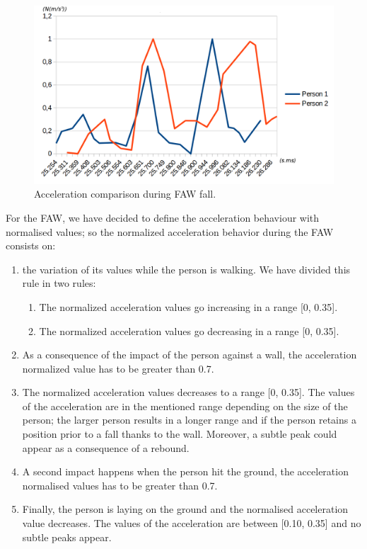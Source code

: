 \documentclass[review]{elsarticle}
\begin{document}
\begin{figure}[!ht]
	\centering
	\includegraphics[scale=0.25]{Images/TwoFallsComparative.png}
	\caption[Acceleration during FAW fall]{Acceleration comparison during FAW fall.}
	\label{fig:FAWcomparison}
\end{figure}

For the FAW, we have decided to define the acceleration behaviour with normalised values; so the 
normalized acceleration behavior during the FAW consists on:
\begin{enumerate}
	\item the variation of its values while the person is walking. We have divided this rule in two rules:
	\begin{enumerate}
		\item The normalized acceleration values go increasing in a range [0, 0.35].
		\item The normalized acceleration values go decreasing in a range [0, 0.35].
	\end{enumerate}
	\item As a consequence of the impact of the person against a wall, the acceleration normalized value 
	has to be greater than 0.7.
	\item The normalized acceleration values decreases to a range [0, 0.35]. The values of the acceleration are 
	in the mentioned range depending on the size of the person; the larger person results in a longer range 
	and if the person retains a position prior to a fall thanks to the wall. Moreover, a subtle peak could 
	appear as a consequence of a rebound.
	\item A second impact happens when the person hit the ground, the acceleration normalised values has to 
	be greater than 0.7.
	\item Finally, the person is laying on the ground and the normalised acceleration value decreases. The 
	values of the acceleration are between [0.10, 0.35] and no subtle peaks appear. 
\end{enumerate}
\end{document}
